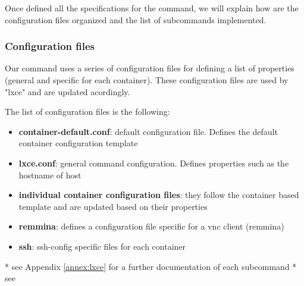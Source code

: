 Once defined all the specifications for the command, we will explain how are the configuration files organized and the list of subcommands implemented.


\subsubsection{Configuration files}
Our command uses a series of configuration files for defining a list of properties (general and specific for each container). These configuration files are used by "lxce" and are updated acordingly.

The list of configuration files is the following:
\begin{itemize}
	\item{\textbf{container-default.conf}: default configuration file. Defines the default container configuration template}
	\item{\textbf{lxce.conf}: general command configuration. Defines properties such as the hostname of host}
	\item{\textbf{individual container configuration files}: they follow the container based template and are updated based on their properties}
	\item{\textbf{remmina}: defines a configuration file specific for a vnc client (remmina) }
	\item{\textbf{ssh}: ssh-config specific files for each container }
\end{itemize}

* see Appendix \ref{annex:lxce} for a further documentation of each subcommand
* see \cite{lxc}

